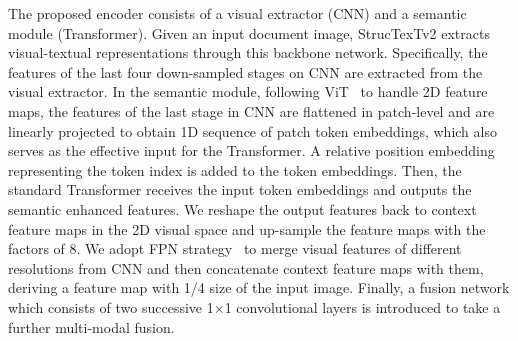 \documentclass{article} %
\begin{document}
The proposed encoder consists of a visual extractor (CNN) and a semantic module (Transformer). Given an input document image, StrucTexTv2 extracts visual-textual representations through this backbone network. Specifically, the features of the last four down-sampled stages on CNN are extracted from the visual extractor. In the semantic module, following ViT~\cite{DBLP:journals/corr/abs-2010-11929} to handle 2D feature maps, the features of the last stage in CNN are flattened in patch-level and are linearly projected to obtain 1D sequence of patch token embeddings, which also serves as the effective input for the Transformer. A relative position embedding representing the token index is added to the token embeddings. 
Then, the standard Transformer receives the input token embeddings and outputs the semantic enhanced features. We reshape the output features back to context feature maps in the 2D visual space and up-sample the feature maps with the factors of 8. We adopt FPN strategy~\cite{lin2017feature} to merge visual features of different resolutions from CNN and then concatenate context feature maps with them, deriving a feature map with 1/4 size of the input image. Finally, a fusion network which consists of two successive 1$\times$1 convolutional layers is introduced to take a further multi-modal fusion.
\end{document}

